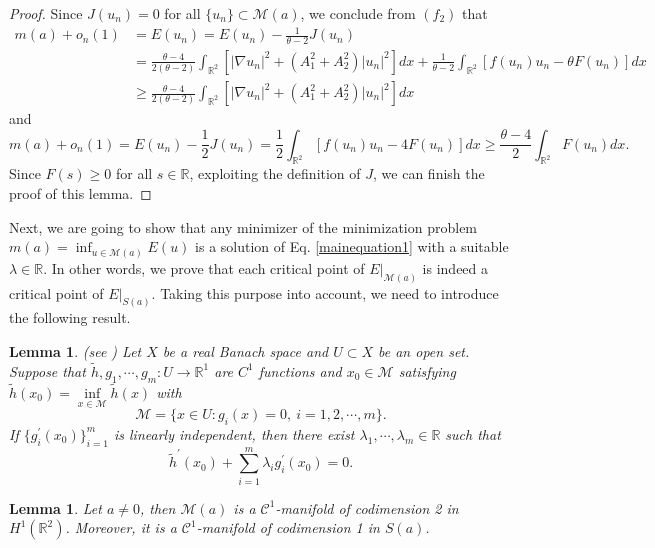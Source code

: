 \documentclass[11pt]{amsart}
\numberwithin{equation}{section}
\newtheorem{lemma}[theorem]{Lemma}
\theoremstyle{definition}
\newcommand{\R}{\mathbb{R}}
\begin{document}
\begin{proof}
Since $J(u_n)=0$ for all $\{u_n\}\subset \mathcal{M}(a)$, we conclude from $(f_2)$ that
\begin{align*}
  m(a)+o_n(1) &=E(u_n)=E(u_n)-\frac{1}{\theta-2}J(u_n) \\
 & = \frac{\theta-4}{2(\theta-2)}\int_{\R^2}[|\nabla u_n|^2+(A_1^2+A_2^2)|u_n|^2]dx+\frac{1}{\theta-2}\int_{\R^{2}}\left[f(u_n)u_n-\theta F(u_n)\right]dx\\
 &\geq \frac{\theta-4}{2(\theta-2)}\int_{\R^2}[|\nabla u_n|^2+(A_1^2+A_2^2)|u_n|^2]dx
\end{align*}
and
\[
  m(a)+o_n(1) =E(u_n)-\frac{1}{2}J(u_n)  =  \frac{1}{2}\int_{\R^{2}}\left[f(u_n)u_n-4 F(u_n)\right]dx
  \geq \frac{\theta-4}{2}\int_{\R^{2}} F(u_n) dx.
\]
Since $F(s)\geq0$ for all $s\in\R$, exploiting the definition of $J$,
we can finish the proof of this lemma.
\end{proof}

Next, we are going to show that any minimizer of the minimization problem $m(a)=\inf_{u\in \mathcal{M}(a)}E(u)$
is a solution of Eq. \eqref{mainequation1} with a suitable $\lambda\in\R$.
In other words, we prove that each critical point of $E|_{\mathcal{M}(a)}$ is indeed a critical point of
$E|_{S(a)}$. Taking this purpose into account, we need to introduce the following result.

\begin{lemma}\label{CHANG}(see \cite[Corollary 4.1.2]{Chang})
 Let $X$ be a real Banach space and $U\subset X$ be an open set. Suppose that $\tilde{h},g_1,\cdots,g_m:U\to\mathbb{R}^1$ are
 $C^1$ functions and $x_0\in \mathcal{M}$ satisfying $\tilde{h}(x_0)=\inf\limits_{x\in \mathcal{M}}\tilde{h}(x)$ with
$$
\mathcal{M}=\{x\in U: g_i(x)=0,~i=1,2,\cdots,m\}.
$$
If
$\{g_i^{\prime}(x_0)\}_{i=1}^m$ is linearly independent, then there exist $\lambda_1,\cdots,\lambda_m\in \R$ such that
$$
\tilde{h}^{\prime}(x_0)+\sum_{i=1}^m\lambda_ig_i^{\prime}(x_0)=0.
$$
\end{lemma}


\begin{lemma}\label{mnifold}
 Let $a\neq0$, then $\mathcal{M}(a)$ is a $\mathcal{C}^1$-manifold of codimension 2 in $H^1(\R^2)$.
 Moreover, it is a $\mathcal{C}^1$-manifold of codimension 1 in $S(a)$.
\end{lemma}
\end{document}
